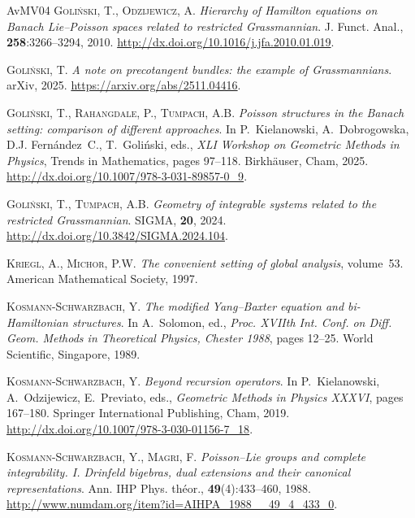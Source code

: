 \documentclass[a4paper,12pt,reqno]{amsart}%
\theoremstyle{definition}
\theoremstyle{remark}
\numberwithin{theorem}{section}
\numberwithin{equation}{section}
\newcommand{\1}{{\bf 1}}
\begin{document}
\begin{thebibliography}{AvMV04}
\textsc{Goliński, T.}, \textsc{Odzijewicz, A.}
\newblock \emph{Hierarchy of {H}amilton equations on {B}anach {L}ie--{P}oisson
  spaces related to restricted {G}rassmannian}.
\newblock J. Funct. Anal., \textbf{258}:3266--3294, 2010.
\newblock \urlprefix\url{http://dx.doi.org/10.1016/j.jfa.2010.01.019}.

\textsc{Goli{\'n}ski, T.}
\newblock \emph{A note on precotangent bundles: the example of
  {G}rassmannians}.
\newblock arXiv, 2025.
\newblock \urlprefix\url{https://arxiv.org/abs/2511.04416}.

\textsc{Goliński, T.}, \textsc{Rahangdale, P.}, \textsc{Tumpach, A.B.}
\newblock \emph{{P}oisson structures in the {B}anach setting: comparison of
  different approaches}.
\newblock In P.~Kielanowski, A.~Dobrogowska, D.J. Fernández~C., T.~Goliński,
  eds., \emph{XLI Workshop on Geometric Methods in Physics}, Trends in
  Mathematics, pages 97--118. Birkh{\"a}user, Cham, 2025.
\newblock \urlprefix\url{http://dx.doi.org/10.1007/978-3-031-89857-0_9}.

\textsc{Goliński, T.}, \textsc{Tumpach, A.B.}
\newblock \emph{Geometry of integrable systems related to the restricted
  {G}rassmannian}.
\newblock SIGMA, \textbf{20}, 2024.
\newblock \urlprefix\url{http://dx.doi.org/10.3842/SIGMA.2024.104}.

\textsc{Kriegl, A.}, \textsc{Michor, P.W.}
\newblock \emph{The convenient setting of global analysis}, volume~53.
\newblock American Mathematical Society, 1997.

\textsc{Kosmann-Schwarzbach, Y.}
\newblock \emph{The modified {Y}ang--{B}axter equation and bi-{H}amiltonian
  structures}.
\newblock In A.~Solomon, ed., \emph{Proc. XVIIth Int. Conf. on Diff. Geom.
  Methods in Theoretical Physics, Chester 1988}, pages 12--25. World
  Scientific, Singapore, 1989.

\textsc{Kosmann-Schwarzbach, Y.}
\newblock \emph{Beyond recursion operators}.
\newblock In P.~Kielanowski, A.~Odzijewicz, E.~Previato, eds., \emph{Geometric
  Methods in Physics XXXVI}, pages 167--180. Springer International Publishing,
  Cham, 2019.
\newblock \urlprefix\url{http://dx.doi.org/10.1007/978-3-030-01156-7_18}.

\textsc{Kosmann-Schwarzbach, Y.}, \textsc{Magri, F.}
\newblock \emph{{P}oisson--{L}ie groups and complete integrability. {I}.
  {D}rinfeld bigebras, dual extensions and their canonical representations}.
\newblock Ann. IHP Phys. th{\'e}or., \textbf{49}(4):433--460, 1988.
\newblock \urlprefix\url{http://www.numdam.org/item?id=AIHPA_1988__49_4_433_0}.


\end{thebibliography}
\end{document}
